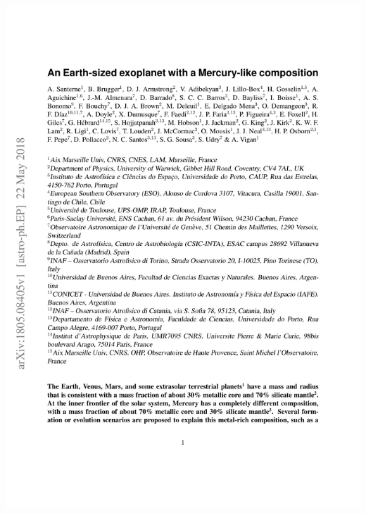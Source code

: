 {%
    {\includegraphics[width=.92\textwidth, keepaspectratio=true, page = 1, trim = 1.3cm 1cm 1.3cm 1cm, clip = true]{appendices/papers/Santerne2018_grey.pdf}}


}
